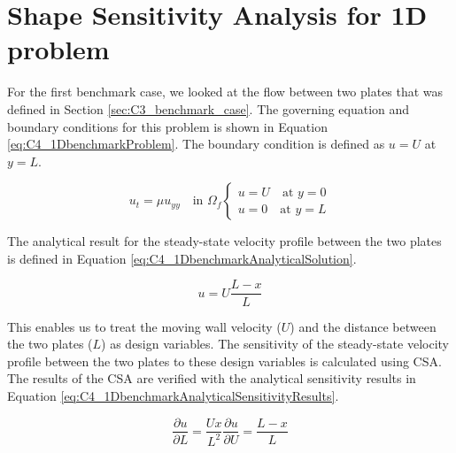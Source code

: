 \section{Shape Sensitivity Analysis for 1D problem}
For the first benchmark case, we looked at the flow between two plates that was defined in Section \ref{sec:C3_benchmark_case}. The governing equation and boundary conditions for this problem is shown in Equation \eqref{eq:C4_1DbenchmarkProblem}. The boundary condition is defined as $u = U$ at $y = L$.

\begin{subequations}\label{eq:C4_1DbenchmarkProblem}
\begin{equation}\label{eq:C4_1DbenchmarkGoverningEquation}
    u_t = \mu u_{yy} \quad \text{in } \Omega_f
\end{equation}
\begin{equation}\label{eq:C4_1DbenchmarkBoundaryCondition}
\begin{cases}
    u = U \quad \text{at } y = 0 \\
    u = 0 \quad \text{at } y = L
\end{cases}
\end{equation}
\end{subequations}

The analytical result for the steady-state velocity profile between the two plates is defined in Equation \eqref{eq:C4_1DbenchmarkAnalyticalSolution}.

\begin{equation}\label{eq:C4_1DbenchmarkAnalyticalSolution}
    u = U\frac{L - x}{L}
\end{equation}

This enables us to treat the moving wall velocity ($U$) and the distance between the two plates ($L$) as design variables. The sensitivity of the steady-state velocity profile between the two plates to these design variables is calculated using CSA. The results of the CSA are verified with the analytical sensitivity results in Equation \eqref{eq:C4_1DbenchmarkAnalyticalSensitivityResults}.

\begin{subequations}\label{eq:C4_1DbenchmarkAnalyticalSensitivityResults}
\begin{equation}\label{eq:C4_1DbenchmarkAnalyticalSAlength}
    \frac{\partial u}{\partial L} = \frac{Ux}{L^2}
\end{equation}
\begin{equation}\label{eq:C4_1DbenchmarkAnalyticalSAvelocity}
    \frac{\partial u}{\partial U} = \frac{L - x}{L}
\end{equation}
\end{subequations}


